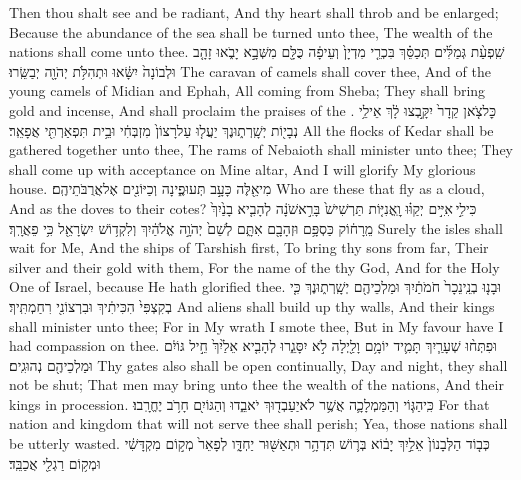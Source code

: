 {Then thou shalt see and be radiant, And thy heart shall throb and be enlarged; Because the abundance of the sea shall be turned unto thee, The wealth of the nations shall come unto thee.}
{שִֽׁפְעַ֨ת גְּמַלִּ֜ים תְּכַסֵּ֗ךְ בִּכְרֵ֤י מִדְיָן֙ וְעֵיפָ֔ה כֻּלָּ֖ם מִשְּׁבָ֣א יָבֹ֑אוּ זָהָ֤ב וּלְבוֹנָה֙ יִשָּׂ֔אוּ וּתְהִלֹּ֥ת יְהֹוָ֖ה יְבַשֵּֽׂרוּ׃}
{The caravan of camels shall cover thee, And of the young camels of Midian and Ephah, All coming from Sheba; They shall bring gold and incense, And shall proclaim the praises of the \lord.}
{כׇּל\maqqaf צֹ֤אן קֵדָר֙ יִקָּ֣בְצוּ לָ֔ךְ אֵילֵ֥י נְבָי֖וֹת יְשָֽׁרְת֑וּנֶךְ יַעֲל֤וּ עַל\maqqaf רָצוֹן֙ מִזְבְּחִ֔י וּבֵ֥ית תִּפְאַרְתִּ֖י אֲפָאֵֽר׃}
{All the flocks of Kedar shall be gathered together unto thee, The rams of Nebaioth shall minister unto thee; They shall come up with acceptance on Mine altar, And I will glorify My glorious house.}
{מִי\maqqaf אֵ֖לֶּה כָּעָ֣ב תְּעוּפֶ֑ינָה וְכַיּוֹנִ֖ים אֶל\maqqaf אֲרֻבֹּתֵיהֶֽם׃}
{Who are these that fly as a cloud, And as the doves to their cotes?}
{כִּי\maqqaf לִ֣י \legarmeh  אִיִּ֣ים יְקַוּ֗וּ וׇֽאֳנִיּ֤וֹת תַּרְשִׁישׁ֙ בָּרִ֣אשֹׁנָ֔ה לְהָבִ֤יא בָנַ֙יִךְ֙ מֵֽרָח֔וֹק כַּסְפָּ֥ם וּזְהָבָ֖ם אִתָּ֑ם לְשֵׁם֙ יְהֹוָ֣ה אֱלֹהַ֔יִךְ וְלִקְד֥וֹשׁ יִשְׂרָאֵ֖ל כִּ֥י פֵאֲרָֽךְ׃}
{Surely the isles shall wait for Me, And the ships of Tarshish first, To bring thy sons from far, Their silver and their gold with them, For the name of the \lord\space thy God, And for the Holy One of Israel, because He hath glorified thee.}
{וּבָנ֤וּ בְנֵֽי\maqqaf נֵכָר֙ חֹמֹתַ֔יִךְ וּמַלְכֵיהֶ֖ם יְשָֽׁרְת֑וּנֶךְ כִּ֤י בְקִצְפִּי֙ הִכִּיתִ֔יךְ וּבִרְצוֹנִ֖י רִחַמְתִּֽיךְ׃}
{And aliens shall build up thy walls, And their kings shall minister unto thee; For in My wrath I smote thee, But in My favour have I had compassion on thee.}
{וּפִתְּח֨וּ שְׁעָרַ֧יִךְ תָּמִ֛יד יוֹמָ֥ם וָלַ֖יְלָה לֹ֣א יִסָּגֵ֑רוּ לְהָבִ֤יא אֵלַ֙יִךְ֙ חֵ֣יל גּוֹיִ֔ם וּמַלְכֵיהֶ֖ם נְהוּגִֽים׃}
{Thy gates also shall be open continually, Day and night, they shall not be shut; That men may bring unto thee the wealth of the nations, And their kings in procession.}
{כִּֽי\maqqaf הַגּ֧וֹי וְהַמַּמְלָכָ֛ה אֲשֶׁ֥ר לֹא\maqqaf יַעַבְד֖וּךְ יֹאבֵ֑דוּ וְהַגּוֹיִ֖ם חָרֹ֥ב יֶחֱרָֽבוּ׃}
{For that nation and kingdom that will not serve thee shall perish; Yea, those nations shall be utterly wasted.}
{כְּב֤וֹד הַלְּבָנוֹן֙ אֵלַ֣יִךְ יָב֔וֹא בְּר֛וֹשׁ תִּדְהָ֥ר וּתְאַשּׁ֖וּר יַחְדָּ֑ו לְפָאֵר֙ מְק֣וֹם מִקְדָּשִׁ֔י וּמְק֥וֹם רַגְלַ֖י אֲכַבֵּֽד׃}
